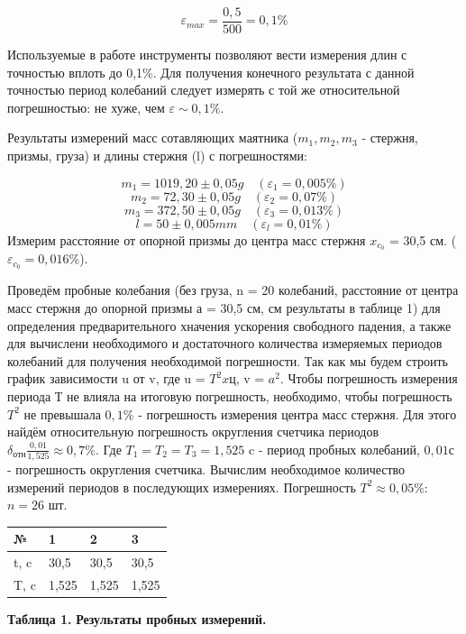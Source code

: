 \[
    \varepsilon_{max} = \frac{0,5}{500} = 0,1\% 
\]

    Используемые в работе инструменты позволяют вести измерения длин
    с точностью вплоть до 0,1\%. Для получения конечного результата с данной точностью период колебаний следует измерять с той же относительной погрешностью: не хуже, чем $\varepsilon\sim0,1\%$.
    
    Результаты измерений масс сотавляющих маятника ($m_{1}, m_{2}, m_{3}$ - стержня, призмы, груза) и длины стержня (l) с погрешностями:
    
\[
    m_{1} = 1019,20 \pm 0,05 g  \quad  (\varepsilon_{1} = 0,005\%)
\]
\[
    m_{2} = 72,30 \pm 0,05 g  \quad   (\varepsilon_{2} = 0,07\%)
\]
\[
    m_{3} = 372,50 \pm 0,05 g  \quad   (\varepsilon_{3} = 0,013\%)
\]
\[
    l  = 50 \pm 0,005 mm  \quad   (\varepsilon_l = 0,01\%)
\]
    Измерим расстояние от опорной призмы до центра масс стержня $x_{c_0}$ = 30,5 см. ($\varepsilon_{c_0} = 0,016\%$).
    
    Проведём пробные колебания (без груза, n = 20 колебаний, расстояние от центра масс стержня до опорной призмы а = 30,5 см, см результаты в таблице 1) для определения предварительного хначения ускорения свободного падения, а также для вычислени необходимого и достаточного количества измеряемых периодов колебаний для получения необходимой погрешности. Так как мы будем строить график зависимости u от v, где u = $T^2xц$, v = $a^2$. Чтобы погрешность измерения периода Т не влияла на итоговую погрешность, необходимо, чтобы погрешность $T^2$ не превышала $0,1\%$ - погрешность измерения центра масс стержня. Для этого найдём относительную погрешность округления счетчика периодов $\delta_{отн}\frac{0,01}{1,525} \approx 0,7\%$. Где $T_1 = T_2 = T_3 = 1,525$ c - период пробных колебаний, $0,01 с$ - погрешность округления счетчика. Вычислим необходимое количество измерений периодов в последующих измерениях. Погрешность $T^2 \approx 0,05\%$: $n = 26$ шт. 

   
\begin{table}[H]
\centering
\begin{tabular}{|l|l|l|l|}
\hline
    №    & 1    & 2    & 3    \\ \hline
    t, c & 30,5 & 30,5 & 30,5 \\ \hline
    T, c & 1,525 & 1,525 & 1,525 \\ \hline
\end{tabular}
\end{table}

\begin{flushright}
{\scriptsize \textbf{Таблица 1.} \textbf {Результаты пробных измерений.}}
\end{flushright}

